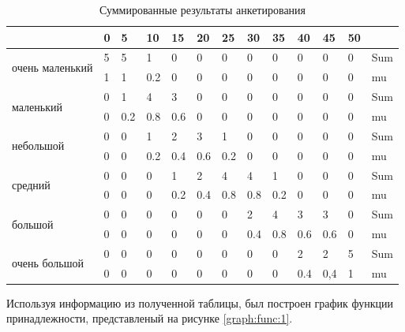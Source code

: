 \begin{table}[!h]
\centering
    \caption{Суммированные результаты анкетирования}
\begin{tabular}{|l|l|l|l|l|l|l|l|l|l|l|l|l|}
\hline
                                 & 0 & 5   & 10  & 15  & 20  & 25  & 30  & 35  & 40  & 45  & 50 &     \\ \hline
\multirow{2}{*}{очень маленький} & 5 & 5   & 1   & 0   & 0   & 0   & 0   & 0   & 0   & 0   & 0  & Sum \\ \cline{2-13} 
                                 & 1 & 1   & 0.2 & 0   & 0   & 0   & 0   & 0   & 0   & 0   & 0  & mu  \\ \hline
\multirow{2}{*}{маленький}       & 0 & 1   & 4   & 3   & 0   & 0   & 0   & 0   & 0   & 0   & 0  & Sum \\ \cline{2-13} 
                                 & 0 & 0.2 & 0.8 & 0.6 & 0   & 0   & 0   & 0   & 0   & 0   & 0  & mu  \\ \hline
\multirow{2}{*}{небольшой}       & 0 & 0   & 1   & 2   & 3   & 1   & 0   & 0   & 0   & 0   & 0  & Sum \\ \cline{2-13} 
                                 & 0 & 0   & 0.2 & 0.4 & 0.6 & 0.2 & 0   & 0   & 0   & 0   & 0  & mu  \\ \hline
\multirow{2}{*}{средний}         & 0 & 0   & 0   & 1   & 2   & 4   & 4   & 1   & 0   & 0   & 0  & Sum \\ \cline{2-13} 
                                 & 0 & 0   & 0   & 0.2 & 0.4 & 0.8 & 0.8 & 0.2 & 0   & 0   & 0  & mu  \\ \hline
\multirow{2}{*}{большой}         & 0 & 0   & 0   & 0   & 0   & 0   & 2   & 4   & 3   & 3   & 0  & Sum \\ \cline{2-13} 
                                 & 0 & 0   & 0   & 0   & 0   & 0   & 0.4 & 0.8 & 0.6 & 0.6 & 0  & mu  \\ \hline
\multirow{2}{*}{очень большой}   & 0 & 0   & 0   & 0   & 0   & 0   & 0   & 0   & 2   & 2   & 5  & Sum \\ \cline{2-13} 
                                 & 0 & 0   & 0   & 0   & 0   & 0   & 0   & 0   & 0.4 & 0,4 & 1  & mu  \\ \hline
\end{tabular}
\label{tab:sumanket}
\end{table}
\newpage
\par Используя информацию из полученной таблицы, был построен график функции принадлежности, представленый на рисунке \ref{graph:func:1}.

